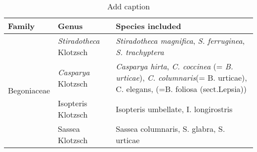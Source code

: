 \begin{table}[htbp]
  \centering
  \caption{Add caption}
    \begin{tabular}{cll}
    \toprule
    \multicolumn{1}{l}{Family} & Genus & Species included \\
    \midrule
    \multirow{4}[8]{*}{Begoniaceae} & \textit{Stiradotheca} Klotzsch & \textit{Stiradotheca magnifica}, \textit{S. ferruginea}, \textit{S. trachyptera} \\
\cmidrule{2-3}          & \textit{Casparya} Klotzsch & \multicolumn{1}{p{37.355em}}{\textit{Casparya hirta}, \textit{C. coccinea} (= \textit{B. urticae}), \textit{C. columnaris}\newline{}(= B. urticae), C. elegans, (=B. foliosa (sect.\newline{}Lepsia))} \\
\cmidrule{2-3}          & Isopteris Klotzsch & Isopteris umbellate, I. longirostris \\
\cmidrule{2-3}          & Sassea Klotzsch & Sassea columnaris, S. glabra, S. urticae \\
    \bottomrule
    \bottomrule
    \end{tabular}%
  \label{tab:addlabel}%
\end{table}%

